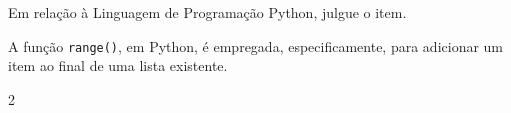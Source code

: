 {%
\item \rtask \ponto{\pt} 
Em relação à Linguagem de Programação Python, julgue o item.

A função \lstinline[style=Python]|range()|, em Python, é empregada, especificamente, para adicionar um item ao final de uma lista existente.

{\setlength{\columnsep}{0pt}\renewcommand{\columnseprule}{0pt}
\begin{multicols}{2}
\begin{answerlist}[label={\texttt{\Alph*}.},leftmargin=*]
    \ti[V.]
    \ifnum{}\doneitem[F.]\else\ti[F.]\fi %
\end{answerlist}
\end{multicols}
}

% 
% 
% 
% 
% 
% 
}

